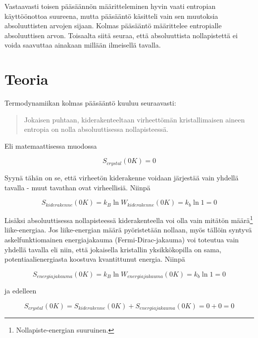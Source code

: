 \documentclass[12pt,a4paper,finnish]{book}
\begin{document}
Vastaavasti toisen pääsäännön määritteleminen hyvin vaati entropian käyttöönottoa suureena, mutta pääsääntö 
käsitteli vain sen muutoksia absoluuttisten arvojen sijaan. Kolmas pääsääntö määrittelee entropialle 
absoluuttisen arvon. Toisaalta siitä seuraa, että absoluuttista nollapistettä ei voida saavuttaa ainakaan 
millään ilmeisellä tavalla.

\section{Teoria} %

Termodynamiikan kolmas pääsääntö kuuluu seuraavasti:

\begin{quote}
 Jokaisen puhtaan, kiderakenteeltaan virheettömän kristallimaisen aineen entropia on 
 nolla absoluuttisessa nollapisteessä.
\end{quote}

Eli matemaattisessa muodossa

\begin{equation}
 S_{crystal}(0 K) = 0
\end{equation}

Syynä tähän on se, että virheetön kiderakenne voidaan järjestää vain yhdellä tavalla - muut tavathan 
ovat virheellisiä. Niinpä

\begin{equation}
 S_{kiderakenne}(0K) = k_B \ln W_{kiderakenne}(0K) = k_b \ln 1 = 0
\end{equation}

Lisäksi absoluuttisessa nollapisteessä kiderakenteella voi olla vain mitätön 
määrä\footnote{Nollapiste-energian suuruinen.} liike-energiaa. Jos liike-energian määrä pyöristetään 
nollaan, myös tällöin syntyvä askelfunktiomainen energiajakauma (Fermi-Dirac-jakauma) voi toteutua 
vain yhdellä tavalla eli niin, että jokaisella kristallin yksikkökopilla on sama, potentiaalienergiasta 
koostuva kvantittunut energia. Niinpä

\begin{equation}
 S_{energiajakauma}(0K) = k_B \ln W_{energiajakauma}(0K) = k_b \ln 1 = 0
\end{equation}

ja edelleen

\begin{equation}
 S_{crystal}(0K) = S_{kiderakenne}(0K) + S_{energiajakauma}(0K) = 0 + 0 = 0
\end{equation}
\end{document}
